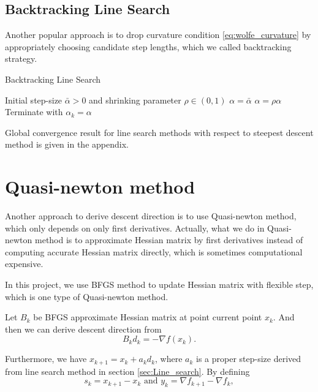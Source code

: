\documentclass[11pt]{report}
\begin{document}

\subsection{Backtracking Line Search}
Another popular approach is to drop curvature condition \eqref{eq:wolfe_curvature} by appropriately choosing candidate step lengths, which we called backtracking strategy.
\begin{algorithm}[H]
\caption{Backtracking Line Search}
\label{alg:Backtracking Line Search}
\begin{algorithmic}[1]
\REQUIRE Initial step-size $\bar{\alpha} >0$ and shrinking parameter $\rho \in (0,1)$
\STATE $\alpha = \bar{\alpha}$
\REPEAT
    \STATE $\alpha = \rho \alpha$
\STATE Terminate with $\alpha_k = \alpha$
\end{algorithmic}
\end{algorithm}

Global convergence result for line search methods with respect to steepest descent method is given in the appendix. 

\section{Quasi-newton method}\label{sec: Quasi-newton method}
Another approach to derive descent direction is to use Quasi-newton method, which only depends on only first derivatives. Actually, what we do in Quasi-newton method is to approximate Hessian matrix by first derivatives instead of computing accurate Hessian matrix directly, which is sometimes computational expensive.

In this project, we use BFGS method to update Hessian matrix with flexible step, which is one type of Quasi-newton method. 

Let $B_k$ be BFGS approximate Hessian matrix at point current point $x_k$. And then we can derive descent direction from
\begin{equation}\label{eq:BFGSupdate}
    B_kd_k = -\nabla f(x_k). 
\end{equation}

Furthermore, we have $x_{k+1} = x_k + a_kd_k$, where $a_k$ is a proper step-size derived from line search method in section \ref{sec:Line_search}. By defining
\begin{equation}
    s_k = x_{k+1} - x_k \mbox{~and~} y_k = \nabla f_{k+1} - \nabla f_k,
\end{equation}
\end{document}
